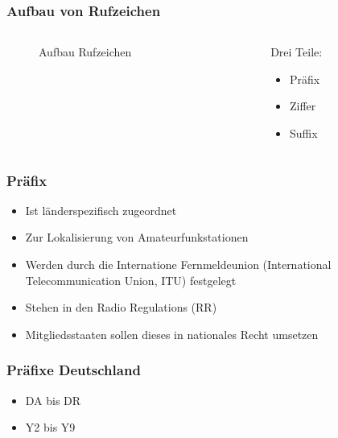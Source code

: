 \begin{frame}
\frametitle{Aufbau von Rufzeichen}
\begin{columns}
    \begin{column}{0.48\textwidth}
    
\begin{figure}
    \caption{\scriptsize Aufbau Rufzeichen}
    \label{n_amateurfunkstrationen_aufbau_rufzeichen}
\end{figure}


    \end{column}
   \begin{column}{0.48\textwidth}
       Drei Teile:

\begin{itemize}
  \item Präfix
  \item Ziffer
  \item Suffix
  \end{itemize}

   \end{column}
\end{columns}

\end{frame}

\begin{frame}
\frametitle{Präfix}
\begin{itemize}
  \item Ist länderspezifisch zugeordnet
  \item Zur Lokalisierung von Amateurfunkstationen
  \item Werden durch die Internatione Fernmeldeunion (International Telecommunication Union, ITU) festgelegt
  \item Stehen in den Radio Regulations (RR)
  \item Mitgliedsstaaten sollen dieses in nationales Recht umsetzen
  \end{itemize}
\end{frame}

\begin{frame}
\frametitle{Präfixe Deutschland}
\begin{itemize}
  \item DA bis DR
  \item Y2 bis Y9
  \end{itemize}

\end{frame}

